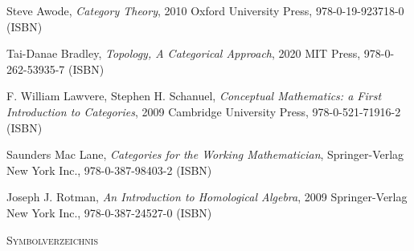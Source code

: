 \documentclass[a4paper]{amsart}
\theoremstyle{definition}
\begin{document}
\begin{thebibliography}{9}
      Steve Awode, \emph{Category Theory},
      2010 Oxford University Press, 978-0-19-923718-0 (ISBN)

      Tai-Danae Bradley, \emph{Topology, A Categorical Approach},
      2020 MIT Press, 978-0-262-53935-7 (ISBN)

      F. William Lawvere, Stephen H. Schanuel, \emph{Conceptual Mathematics: a First Introduction to Categories},
      2009 Cambridge University Press, 978-0-521-71916-2 (ISBN)

      Saunders Mac Lane, \emph{Categories for the Working Mathematician},
      Springer-Verlag New York Inc., 978-0-387-98403-2 (ISBN)

   	Joseph J. Rotman, \emph{An Introduction to Homological Algebra},
   	2009 Springer-Verlag New York Inc., 978-0-387-24527-0 (ISBN)

\end{thebibliography}

\begin{large}
    \centerline{\textsc{Symbolverzeichnis}}
\end{large}
\bigskip

\renewcommand*{\arraystretch}{1}
\end{document}
